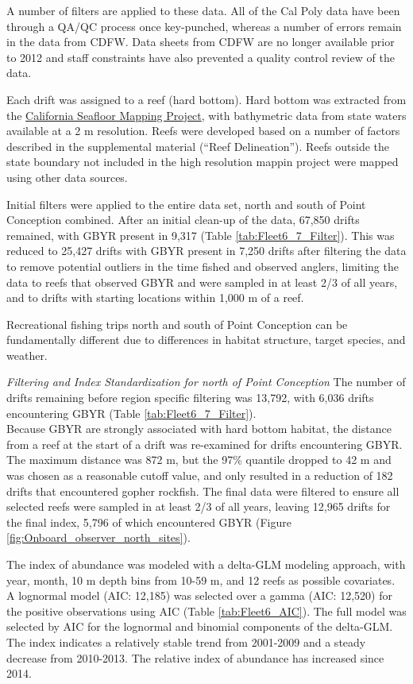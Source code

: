 \documentclass[12pt,]{article}
\begin{document}
A number of filters are applied to these data. All of the Cal Poly data
have been through a QA/QC process once key-punched, whereas a number of
errors remain in the data from CDFW. Data sheets from CDFW are no longer
available prior to 2012 and staff constraints have also prevented a
quality control review of the data.

Each drift was assigned to a reef (hard bottom). Hard bottom was
extracted from the
\href{http://seafloor.otterlabs.org/index.html}{California Seafloor
Mapping Project}, with bathymetric data from state waters available at a
2 m resolution. Reefs were developed based on a number of factors
described in the supplemental material (``Reef Delineation''). Reefs
outside the state boundary not included in the high resolution mappin
project were mapped using other data sources.

Initial filters were applied to the entire data set, north and south of
Point Conception combined. After an initial clean-up of the data, 67,850
drifts remained, with GBYR present in 9,317 (Table
\ref{tab:Fleet6_7_Filter}). This was reduced to 25,427 drifts with GBYR
present in 7,250 drifts after filtering the data to remove potential
outliers in the time fished and observed anglers, limiting the data to
reefs that observed GBYR and were sampled in at least 2/3 of all years,
and to drifts with starting locations within 1,000 m of a reef.

Recreational fishing trips north and south of Point Conception can be
fundamentally different due to differences in habitat structure, target
species, and weather.

\emph{Filtering and Index Standardization for north of Point Conception}
The number of drifts remaining before region specific filtering was
13,792, with 6,036 drifts encountering GBYR (Table
\ref{tab:Fleet6_7_Filter}).\\
Because GBYR are strongly associated with hard bottom habitat, the
distance from a reef at the start of a drift was re-examined for drifts
encountering GBYR. The maximum distance was 872 m, but the 97\% quantile
dropped to 42 m and was chosen as a reasonable cutoff value, and only
resulted in a reduction of 182 drifts that encountered gopher rockfish.
The final data were filtered to ensure all selected reefs were sampled
in at least 2/3 of all years, leaving 12,965 drifts for the final index,
5,796 of which encountered GBYR (Figure
\ref{fig:Onboard_observer_north_sites}).

The index of abundance was modeled with a delta-GLM modeling approach,
with year, month, 10 m depth bins from 10-59 m, and 12 reefs as possible
covariates. A lognormal model (AIC: 12,185) was selected over a gamma
(AIC: 12,520) for the positive observations using AIC (Table
\ref{tab:Fleet6_AIC}). The full model was selected by AIC for the
lognormal and binomial components of the delta-GLM. The index indicates
a relatively stable trend from 2001-2009 and a steady decrease from
2010-2013. The relative index of abundance has increased since 2014.
\end{document}
